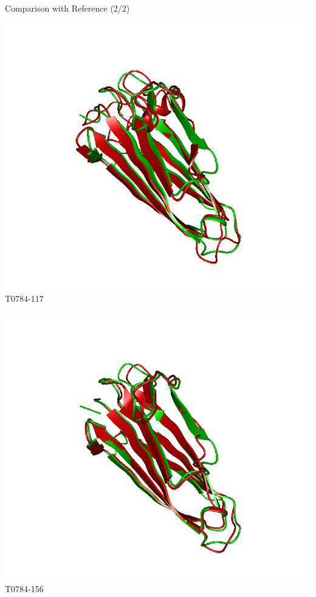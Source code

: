 \begin{frame}{Comparison with Reference (2/2)}
    \begin{center}
        \begin{minipage}{.45\textwidth}
            \includegraphics[width=\textwidth]{../report/figures/T0784TS117}\\
            {T0784-117}
        \end{minipage}
        \begin{minipage}{.45\textwidth}
            \includegraphics[width=\textwidth]{../report/figures/T0784TS156}\\
            {T0784-156}
        \end{minipage}
    \end{center}
\end{frame}

